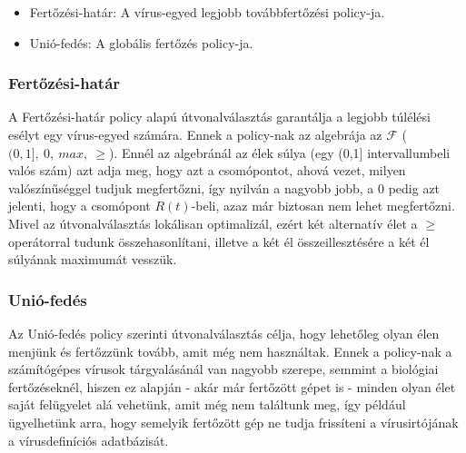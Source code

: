     \begin{itemize}
      \item Fertőzési-határ: A vírus-egyed legjobb továbbfertőzési policy-ja.
      \item Unió-fedés: A globális fertőzés policy-ja. 
    \end{itemize}

      \subsubsection{Fertőzési-határ}

      A Fertőzési-határ policy alapú útvonalválasztás garantálja a legjobb túlélési esélyt egy vírus-egyed számára. Ennek a policy-nak az algebrája az $\mathcal{F}$ ($(0,1],~0,~max,~\geq$). Ennél az algebránál az élek súlya (egy (0,1] intervallumbeli valós szám) azt adja meg, hogy azt a csomópontot, ahová vezet, milyen valószínűséggel tudjuk megfertőzni, így nyilván a nagyobb jobb, a 0 pedig azt jelenti, hogy a csomópont $R(t)$-beli, azaz már biztosan nem lehet megfertőzni. Mivel az útvonalválasztás lokálisan optimalizál, ezért két alternatív élet a $\geq$ operátorral tudunk összehasonlítani, illetve a két él összeillesztésére a két él súlyának maximumát vesszük.

      \subsubsection{Unió-fedés}

      Az Unió-fedés policy szerinti útvonalválasztás célja, hogy lehetőleg olyan élen menjünk és fertőzzünk tovább, amit még nem használtak. Ennek a policy-nak a számítógépes vírusok tárgyalásánál van nagyobb szerepe, semmint a biológiai fertőzéseknél, hiszen ez alapján - akár már fertőzött gépet is - minden olyan élet saját felügyelet alá vehetünk, amit még nem találtunk meg, így például ügyelhetünk arra, hogy semelyik fertőzött gép ne tudja frissíteni a vírusirtójának a vírusdefiníciós adatbázisát.

